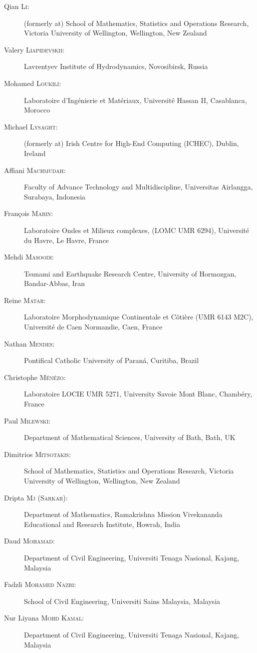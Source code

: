 \begin{description}
  \item[Qian \textsc{Li}:] (formerly at) School of Mathematics, Statistics and Operations Research, Victoria University of Wellington, Wellington, New Zealand
  \item[Valery \textsc{Liapidevskii}:] Lavrentyev Institute of Hydrodynamics, Novosibirsk, Russia
  \item[Mohamed \textsc{Loukili}:] Laboratoire d'Ing\'enierie et Mat\'eriaux, Universit\'e Hassan II, Casablanca, Morocco
  \item[Michael \textsc{Lysaght}:] (formerly at) Irish Centre for High-End Computing (ICHEC), Dublin, Ireland
  \item[Affiani \textsc{Machmudah}:] Faculty of Advance Technology and Multidiscipline, Universitas Airlangga, Surabaya, Indonesia
  \item[Fran\c{c}ois \textsc{Marin}:] Laboratoire Ondes et Milieux complexes, (LOMC UMR 6294), Universit\'e du Havre, Le Havre, France
  \item[Mehdi \textsc{Masoodi}:] Tsunami and Earthquake Research Centre, University of Hormozgan, Bandar-Abbas, Iran
  \item[Reine \textsc{Matar}:] Laboratoire Morphodynamique Continentale et C\^oti\`ere (UMR 6143 M2C), Universit\'e de Caen Normandie, Caen, France
  \item[Nathan \textsc{Mendes}:] Pontifical Catholic University of Paran\'a, Curitiba, Brazil
  \item[Christophe \textsc{M\'en\'ezo}:] Laboratoire LOCIE UMR 5271, University Savoie Mont Blanc, Chamb\'ery, France
  \item[Paul \textsc{Milewski}:] Department of Mathematical Sciences, University of Bath, Bath, UK
  \item[Dimitrios \textsc{Mitsotakis}:] School of Mathematics, Statistics and Operations Research, Victoria University of Wellington, Wellington, New Zealand
  \item[Dripta \textsc{Mj} (\textsc{Sarkar}):] Department of Mathematics, Ramakrishna Mission Vivekananda Educational and Research Institute, Howrah, India
  \item[Daud \textsc{Mohamad}:] Department of Civil Engineering, Universiti Tenaga Nasional, Kajang, Malaysia
  \item[Fadzli \textsc{Mohamed Nazri}:] School of Civil Engineering, Universiti Sains Malaysia, Malaysia
  \item[Nur Liyana \textsc{Mohd Kamal}:] Department of Civil Engineering, Universiti Tenaga Nasional, Kajang, Malaysia

\end{description}

